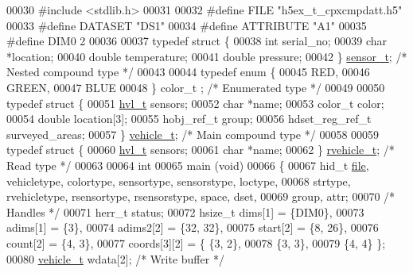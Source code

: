 \begin{DoxyCode}
00030 \textcolor{preprocessor}{#include <stdlib.h>}
00031 
00032 \textcolor{preprocessor}{#define FILE            "h5ex\_t\_cpxcmpdatt.h5"}
00033 \textcolor{preprocessor}{#define DATASET         "DS1"}
00034 \textcolor{preprocessor}{#define ATTRIBUTE       "A1"}
00035 \textcolor{preprocessor}{#define DIM0            2}
00036 
00037 \textcolor{keyword}{typedef} \textcolor{keyword}{struct }\{
00038     \textcolor{keywordtype}{int}     serial\_no;
00039     \textcolor{keywordtype}{char}    *location;
00040     \textcolor{keywordtype}{double}  temperature;
00041     \textcolor{keywordtype}{double}  pressure;
00042 \} \hyperlink{structsensor__t}{sensor\_t};                                 \textcolor{comment}{/* Nested compound type */}
00043 
00044 \textcolor{keyword}{typedef} \textcolor{keyword}{enum} \{
00045     RED,
00046     GREEN,
00047     BLUE
00048 \} color\_t  ;                                \textcolor{comment}{/* Enumerated type */}
00049 
00050 \textcolor{keyword}{typedef} \textcolor{keyword}{struct }\{
00051     \hyperlink{structhvl__t}{hvl\_t}               sensors;
00052     \textcolor{keywordtype}{char}                *name;
00053     color\_t             color;
00054     \textcolor{keywordtype}{double}              location[3];
00055     hobj\_ref\_t          group;
00056     hdset\_reg\_ref\_t     surveyed\_areas;
00057 \} \hyperlink{structvehicle__t}{vehicle\_t};                                \textcolor{comment}{/* Main compound type */}
00058 
00059 \textcolor{keyword}{typedef} \textcolor{keyword}{struct }\{
00060     \hyperlink{structhvl__t}{hvl\_t}       sensors;
00061     \textcolor{keywordtype}{char}        *name;
00062 \} \hyperlink{structrvehicle__t}{rvehicle\_t};                               \textcolor{comment}{/* Read type */}
00063 
00064 \textcolor{keywordtype}{int}
00065 main (\textcolor{keywordtype}{void})
00066 \{
00067     hid\_t       \hyperlink{structfile}{file}, vehicletype, colortype, sensortype, sensorstype, loctype,
00068                 strtype, rvehicletype, rsensortype, rsensorstype, space, dset,
00069                 group, attr;
00070                                             \textcolor{comment}{/* Handles */}
00071     herr\_t      status;
00072     hsize\_t     dims[1] = \{DIM0\},
00073                 adims[1] = \{3\},
00074                 adims2[2] = \{32, 32\},
00075                 start[2] = \{8, 26\},
00076                 count[2] = \{4, 3\},
00077                 coords[3][2] = \{ \{3, 2\},
00078                                  \{3, 3\},
00079                                  \{4, 4\} \};
00080     \hyperlink{structvehicle__t}{vehicle\_t}   wdata[2];                   \textcolor{comment}{/* Write buffer */}

\end{DoxyCode}
